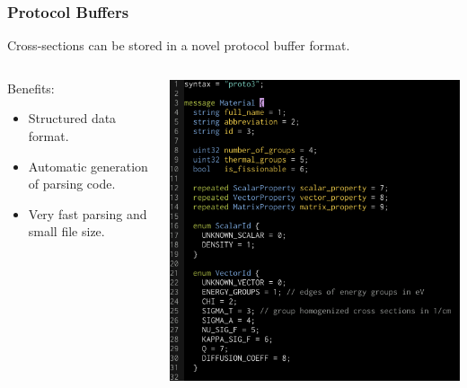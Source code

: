 \documentclass[xcolor=x11names, compress]{beamer}
\begin{document}
\begin{frame}
  \frametitle{Protocol Buffers}
  Cross-sections can be stored in a novel protocol buffer format.
  \begin{columns}
    \begin{column}{0.5\textwidth}
      \pause
      Benefits:
  \begin{itemize}[<+->]
  \item Structured data format.
  \item Automatic generation of parsing code.
  \item Very fast parsing and small file size.
  \end{itemize}
\end{column}
\begin{column}{0.5\textwidth}  %
    \begin{center}
     \includegraphics[width=\textwidth]{images/protocol_buffer}
     \end{center}
\end{column}
\end{columns}

  

    
\end{frame}
\end{document}

